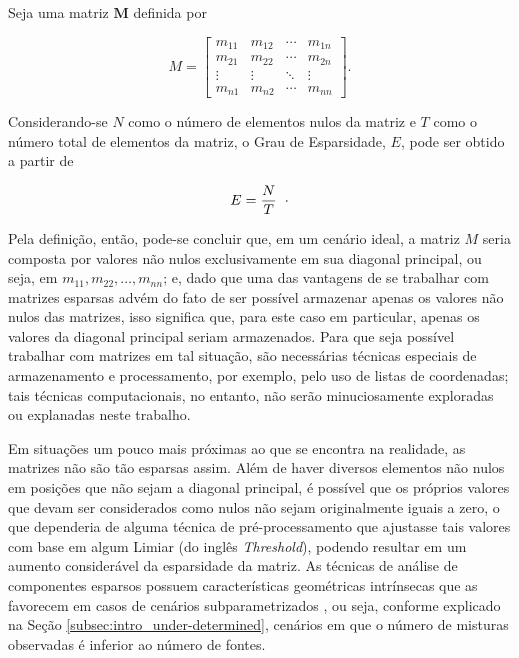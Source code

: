 \begin{definition}
    Seja uma matriz $\bm{M}$ definida por

    \begin{equation}
        M =
        \left[\begin{array}{cccc}
        m_{11} & m_{12} & \cdots & m_{1n} \\
        m_{21} & m_{22} & \cdots & m_{2n} \\
        \vdots & \vdots & \ddots & \vdots \\
        m_{n1} & m_{n2} & \cdots & m_{nn}
        \end{array}\right].
    \end{equation}

    Considerando-se $N$ como o número de elementos nulos da matriz e $T$ como o número total de elementos da matriz, o Grau de Esparsidade, $E$, pode ser obtido a partir de

    \begin{equation}
        E = \dfrac{N}{T}
        \hspace{0.2cm}\cdot
        \label{eq:bss_sparsity}
    \end{equation}

    \label{def:sparsity}
\end{definition}

Pela definição, então, pode-se concluir que, em um cenário ideal, a matriz $M$ seria composta por valores não nulos exclusivamente em sua diagonal principal, ou seja, em $m_{11}, m_{22}, \dots , m_{nn}$; e, dado que uma das vantagens de se trabalhar com matrizes esparsas advém do fato de ser possível armazenar apenas os valores não nulos das matrizes, isso significa que, para este caso em particular, apenas os valores da diagonal principal seriam armazenados. Para que seja possível trabalhar com matrizes em tal situação, são necessárias técnicas especiais de armazenamento e processamento, por exemplo, pelo uso de listas de coordenadas; tais técnicas computacionais, no entanto, não serão minuciosamente exploradas ou explanadas neste trabalho.

Em situações um pouco mais próximas ao que se encontra na realidade, as matrizes não são tão esparsas assim. Além de haver diversos elementos não nulos em posições que não sejam a diagonal principal, é possível que os próprios valores que devam ser considerados como nulos não sejam originalmente iguais a zero, o que dependeria de alguma técnica de pré-processamento que ajustasse tais valores com base em algum Limiar (do inglês \textit{Threshold}), podendo resultar em um aumento considerável da esparsidade da matriz. As técnicas de análise de componentes esparsos possuem características geométricas intrínsecas que as favorecem em casos de cenários subparametrizados \citep{theis2003linear}, ou seja, conforme explicado na Seção \ref{subsec:intro_under-determined}, cenários em que o número de misturas observadas é inferior ao número de fontes.

